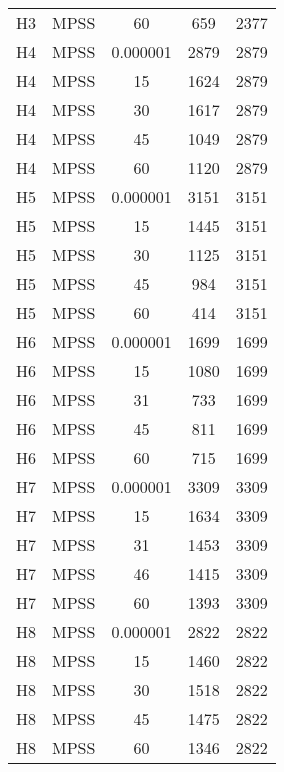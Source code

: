 \begin{center}
\begin{longtable}{ccccc}
H3	&	MPSS	&	60	&	659	&	2377	\\
H4	&	MPSS	&	0.000001	&	2879	&	2879	\\
H4	&	MPSS	&	15	&	1624	&	2879	\\
H4	&	MPSS	&	30	&	1617	&	2879	\\
H4	&	MPSS	&	45	&	1049	&	2879	\\
H4	&	MPSS	&	60	&	1120	&	2879	\\
H5	&	MPSS	&	0.000001	&	3151	&	3151	\\
H5	&	MPSS	&	15	&	1445	&	3151	\\
H5	&	MPSS	&	30	&	1125	&	3151	\\
H5	&	MPSS	&	45	&	984	&	3151	\\
H5	&	MPSS	&	60	&	414	&	3151	\\
H6	&	MPSS	&	0.000001	&	1699	&	1699	\\
H6	&	MPSS	&	15	&	1080	&	1699	\\
H6	&	MPSS	&	31	&	733	&	1699	\\
H6	&	MPSS	&	45	&	811	&	1699	\\
H6	&	MPSS	&	60	&	715	&	1699	\\
H7	&	MPSS	&	0.000001	&	3309	&	3309	\\
H7	&	MPSS	&	15	&	1634	&	3309	\\
H7	&	MPSS	&	31	&	1453	&	3309	\\
H7	&	MPSS	&	46	&	1415	&	3309	\\
H7	&	MPSS	&	60	&	1393	&	3309	\\
H8	&	MPSS	&	0.000001	&	2822	&	2822	\\
H8	&	MPSS	&	15	&	1460	&	2822	\\
H8	&	MPSS	&	30	&	1518	&	2822	\\
H8	&	MPSS	&	45	&	1475	&	2822	\\
H8	&	MPSS	&	60	&	1346	&	2822	\\
\end{longtable}    
\end{center}




